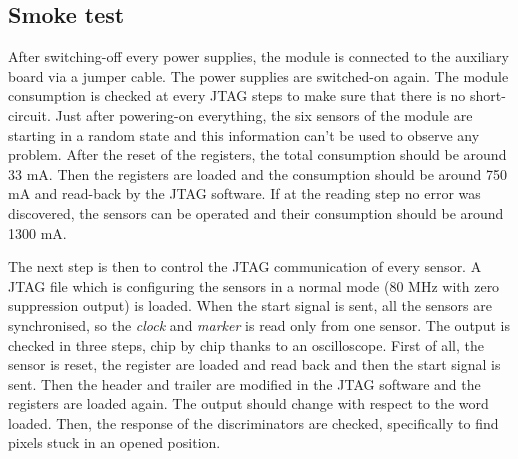 

  \subsection{Smoke test}


  After switching-off every power supplies, the module is connected to the auxiliary board via a jumper cable.
  The power supplies are switched-on again.
  The module consumption is checked at every JTAG steps to make sure that there is no short-circuit.
  Just after powering-on everything, the six sensors of the module are starting in a random state and this information can't be used to observe any problem.
  After the reset of the registers, the total consumption should be around 33 mA.
  Then the registers are loaded and the consumption should be around 750 mA and read-back by the JTAG software.
  If at the reading step no error was discovered, the sensors can be operated and their consumption should be around 1300 mA.

  The next step is then to control the JTAG communication of every sensor.
  A JTAG file which is configuring the sensors in a normal mode (80 MHz with zero suppression output) is loaded.
  When the start signal is sent, all the sensors are synchronised, so the \textit{clock} and \textit{marker} is read only from one sensor.
  The output is checked in three steps, chip by chip thanks to an oscilloscope.
  First of all, the sensor is reset, the register are loaded and read back and then the start signal is sent. 
  Then the header and trailer are modified in the JTAG software and the registers are loaded again.
  The output should change with respect to the word loaded.
  Then, the response of the discriminators are checked, specifically to find pixels stuck in an opened position.

